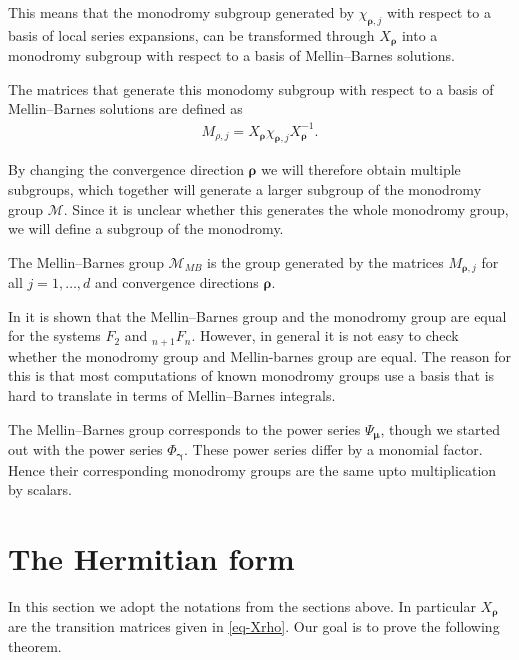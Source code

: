 \documentclass[11pt]{article}
\numberwithin{equation}{section}
\numberwithin{equation}{section}
\begin{document}
This means that the monodromy subgroup generated by $\chi_{\bm\rho,j}$ with respect to a basis of local series expansions, can be transformed through $X_{\bm\rho}$ into a monodromy subgroup with respect to a basis of Mellin--Barnes solutions.

The matrices that generate this monodomy subgroup with respect to a basis of Mellin--Barnes solutions are defined as
\begin{gather*}
M_{\rho,j} = X_{\bm\rho}\chi_{\bm\rho,j}X_{\bm\rho}^{-1}.
\end{gather*}

By changing the convergence direction $\bm\rho$ we will therefore obtain multiple subgroups, which together will generate a larger subgroup of the monodromy group $\mathcal{M}$. Since it is unclear whether this generates the whole monodromy group, we will define a subgroup of the monodromy.

\begin{Definition}%
The Mellin--Barnes group $\mathcal{M}_{MB}$ is the group generated by the matrices $M_{\bm\rho,j}$ for all $j=1,\dots,d$ and convergence directions $\bm\rho$.
\end{Definition}

In \cite{Beu13} it is shown that the Mellin--Barnes group and the monodromy group are equal for the systems $F_2$ and ${}_{n+1}F_n$. However, in general it is not easy to check whether the monodromy group and Mellin-barnes group are equal. The reason for this is that most computations of known monodromy groups use a basis that is hard to translate in terms of Mellin--Barnes integrals.
\begin{Remark}
The Mellin--Barnes group corresponds to the power series $\Psi_{\bm\mu}$, though we started out with the power series $\Phi_{\bm\gamma}$. These power series differ by a monomial factor. Hence their corresponding monodromy groups are the same upto multiplication by scalars.
\end{Remark}

\section{The Hermitian form}\label{chap-herm}
In this section we adopt the notations from the sections above. In particular $X_{\bm\rho}$ are the transition matrices given in \eqref{eq-Xrho}. Our goal is to prove the following theorem.
\end{document}
